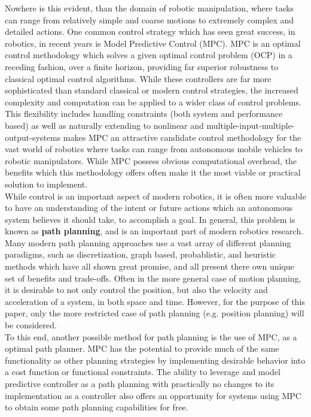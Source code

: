 \documentclass[journal]{IEEEtran}
\begin{document}
Nowhere is this evident, than the domain of robotic manipulation, where tasks can range from relatively simple and coarse motions to extremely complex and detailed actions. One common control strategy which has seen great success, in robotics, in recent years is Model Predictive Control (MPC). MPC is an optimal control methodology which solves a given optimal control problem (OCP) in a receding fashion, over a finite horizon, providing far superior robustness to classical optimal control algorithms. While these controllers are far more sophisticated than standard classical or modern control strategies, the increased complexity and computation can be applied to a wider class of control problems. This flexibility includes handling constraints (both system and performance based) as well as naturally extending to nonlinear and multiple-input-multiple-output-systems makes MPC an attractive candidate control methodology for the vast world of robotics where tasks can range from autonomous mobile vehicles to robotic manipulators. While MPC possess obvious computational overhead, the benefits which this methodology offers often make it the most viable or practical solution to implement. \\

While control is an important aspect of modern robotics, it is often more valuable to have an understanding of the intent or future actions which an autonomous system believes it should take, to accomplish a goal. In general, this problem is known as \textbf{path planning}, and is an important part of modern robotics research. Many modern path planning approaches use a vast array of different planning paradigms, such as discretization, graph based, probablistic, and heuristic methods which have all shown great promise, and all present there own unique set of benefits and trade-offs. Often in the more general case of motion planning, it is desirable to not only control the position, but also the velocity and acceleration of a system, in both space and time. However, for the purpose of this paper, only the more restricted case of path planning (e.g. position planning) will be considered.  \\

To this end, another possible method for path planning is the use of MPC, as a optimal path planner. MPC has the potential to provide much of the same functionality as other planning strategies by implementing desirable behavior into a cost function or functional constraints. The ability to leverage and model predictive controller as a path planning with practically no changes to its implementation as a controller also offers an opportunity for systems using MPC to obtain some path planning capabilities for free.   \\
\end{document}

